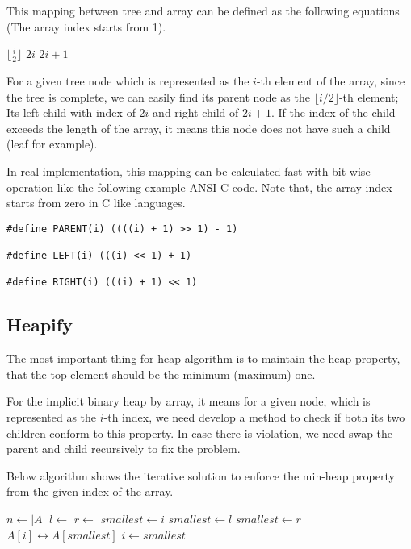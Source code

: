 \documentclass{article}
\begin{document}
This mapping between tree and array can be defined as
the following equations (The array index starts from 1).

\begin{algorithmic}[1]
  \State \Return $\lfloor \frac{i}{2} \rfloor$
\EndFunction
\Statex
{}
  \State \Return $2i$
\EndFunction
\Statex
{}
  \State \Return $2i+1$
\EndFunction
\end{algorithmic}

For a given tree node which is represented as the $i$-th element of the
array, since the tree is complete, we can easily find its parent node
as the $\lfloor i/2 \rfloor$-th element; Its left child
with index of $2i$ and right child of $2i+1$. If the index
of the child exceeds the length of the array, it means this
node does not have such a child (leaf for example).

In real implementation, this mapping can be calculated fast
with bit-wise operation like the following example ANSI C code.
Note that, the array index starts from zero in C like
languages.

\lstset{language=C}
\begin{lstlisting}
#define PARENT(i) ((((i) + 1) >> 1) - 1)

#define LEFT(i) (((i) << 1) + 1)

#define RIGHT(i) (((i) + 1) << 1)
\end{lstlisting}

\subsection{Heapify}

The most important thing for heap algorithm is to maintain the heap
property, that the top element should be the minimum (maximum) one.

For the implicit binary heap by array, it means for a given node,
which is represented as the $i$-th index, we need develop a method
to check if both its two children conform to this property. In case
there is violation, we need swap the parent and child recursively \cite{CLRS}
to fix the problem.

Below algorithm shows the iterative solution to enforce the min-heap
property from the given index of the array.

\begin{algorithmic}[1]
  \State $n \gets |A|$
  \Loop
    \State $l \gets$ 
    \State $r \gets$ 
    \State $smallest \gets i$
      \State $smallest \gets l$
    \EndIf
      \State $smallest \gets r$
    \EndIf
      \State {} $A[i] \leftrightarrow A[smallest]$
      \State $i \gets smallest$
    \Else
      \State \Return
    \EndIf
  \EndLoop
\EndFunction
\end{algorithmic}
\end{document}
